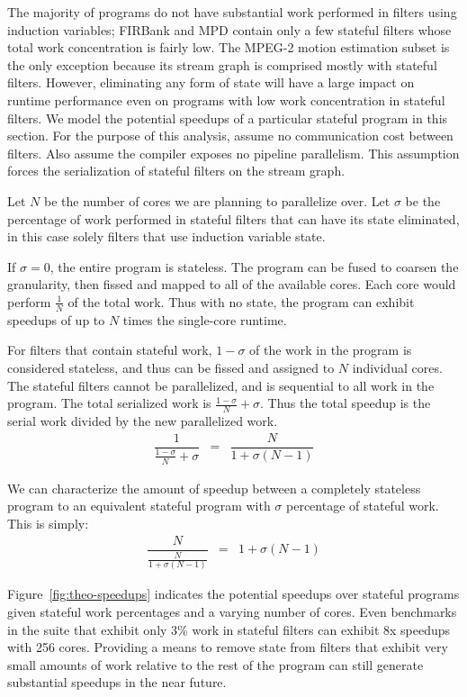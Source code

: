 The majority of programs do not have substantial work performed in
filters using induction variables; FIRBank and MPD contain only a few
stateful filters whose total work concentration is fairly low.  The
MPEG-2 motion estimation subset is the only exception because its
stream graph is comprised mostly with stateful filters.  However,
eliminating any form of state will have a large impact on runtime
performance even on programs with low work concentration in stateful
filters.  We model the potential speedups of a particular stateful
program in this section.  For the purpose of this analysis, 
assume no communication cost between filters.  Also assume the
compiler exposes no pipeline parallelism.  This assumption forces the
serialization of stateful filters on the stream graph.

Let $N$ be the number of cores we are planning to parallelize over.  Let $\sigma$ be the percentage of work performed in stateful filters that can have its state eliminated, in this case solely filters that use induction variable state.  

If $\sigma = 0$, the entire program is stateless.  The program can be fused to coarsen the granularity, then fissed and mapped to all of the available cores.  Each core would perform $\frac{1}{N}$ of the total work.  Thus with no state, the program can exhibit speedups of up to $N$ times the single-core runtime.

For filters that contain stateful work, $1-\sigma$ of the work in the program is considered stateless, and thus can be fissed and assigned to $N$ individual cores.  The stateful filters cannot be parallelized, and is sequential to all work in the program.  The total serialized work is $\frac{1-\sigma}{N} + \sigma$.  Thus the total speedup is the serial work divided by the new parallelized work.  
\begin{eqnarray*}
\dfrac{1}{\frac{1-\sigma}{N} + \sigma} &=& \dfrac{N}{1 + \sigma(N-1)}
\end{eqnarray*}

We can characterize the amount of speedup between a completely stateless program to an equivalent stateful program with $\sigma$ percentage of stateful work.  This is simply:
\begin{eqnarray*}
\dfrac{N}{\frac{N}{1 + \sigma(N-1)}} &=& 1 + \sigma(N-1)
\end{eqnarray*}

Figure~\ref{fig:theo-speedups} indicates the potential speedups over stateful programs given stateful work percentages and a varying number of cores.  Even benchmarks in the suite that exhibit only 3\% work in stateful filters can exhibit 8x speedups with 256 cores.  Providing a means to remove state from filters that exhibit very small amounts of work relative to the rest of the program can still generate substantial speedups in the near future.

